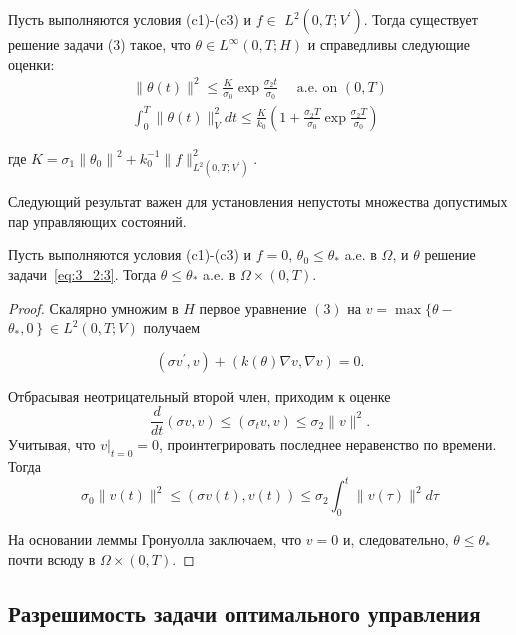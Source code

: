 \begin{lemma}
    \label{lm:3_2:1}
    Пусть выполняются условия (c1)-(c3) и
    $f \in$ $L^{2}\left(0, T ; V^{\prime}\right)$.
    Тогда существует решение задачи (3) такое, что
    $\theta \in L^{\infty}(0, T ; H)$ и справедливы следующие оценки:
    \[
        \begin{gathered}
            \|\theta(t)\|^{2} \leq \frac{K}{\sigma_{0}} \exp \frac{\sigma_{2} t}{\sigma_{0}}
            \quad \text { a.e. on }(0, T) \\
            \int_{0}^{T}\|\theta(t)\|_{V}^{2} d t \leq
            \frac{K}{k_{0}}\left(1+\frac{\sigma_{2} T}{\sigma_{0}} \exp
            \frac{\sigma_{2} T}{\sigma_{0}}\right)
        \end{gathered}
    \]

    где $K=\sigma_{1}\left\|\theta_{0}\right\|^{2}
    + k_{0}^{-1}\|f\|_{L^{2}\left(0, T; V^{\prime}\right)}^{2}$.
\end{lemma}


Следующий результат важен для установления непустоты
множества допустимых пар управляющих состояний.

\begin{lemma}
    \label{lm:3_2:2}
    Пусть выполняются условия (c1)-(c3) и
    $f=0$, $\theta_{0} \leq \theta_{*}$ a.e. в $\Omega$,
    и $\theta$ решение задачи~\eqref{eq:3_2:3}.
    Тогда $\theta \leq \theta_{*}$ a.e. в $\Omega \times(0, T)$.
\end{lemma}

\begin{proof}
    Скалярно умножим в $H$ первое уравнение $(3)$ на
    $v=\max \{\theta-$ $\left.\theta_{*}, 0\right\} \in L^{2}(0, T ; V)$ получаем

    \[ \left(\sigma v^{\prime}, v\right)+(k(\theta) \nabla v, \nabla v)=0. \]

    Отбрасывая неотрицательный второй член, приходим к оценке
    \[ \frac{d}{d t}(\sigma v, v) \leq\left(\sigma_{t} v, v\right) \leq \sigma_{2}\|v\|^{2}. \]
    Учитывая, что $\left.v\right|_{t=0}=0$, проинтегрировать
    последнее неравенство по времени.
    Тогда
    \[ \sigma_{0}\|v(t)\|^{2} \leq(\sigma v(t), v(t)) \leq \sigma_{2} \int_{0}^{t}\|v(\tau)\|^{2} d \tau \]

    На основании леммы Гронуолла заключаем,
    что $v=0$ и, следовательно, $\theta \leq \theta_{*}$ почти всюду в $\Omega\times(0,T)$.
\end{proof}

\subsection{Разрешимость задачи оптимального управления}
\label{subsec:ch3:sec2:subsec5}

